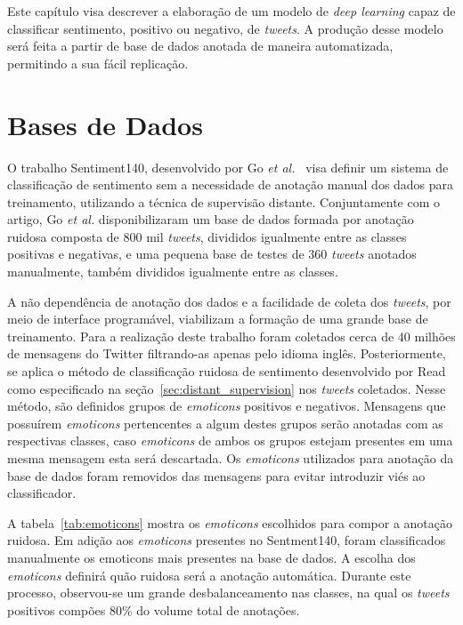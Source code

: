 Este capítulo visa descrever a elaboração de um modelo de \textit{deep learning} capaz de classificar sentimento,
positivo ou negativo, de \textit{tweets}.
A produção desse modelo será feita a partir de base de dados anotada de maneira automatizada, permitindo a sua
fácil replicação.

\section{Bases de Dados} \label{sec:data}

O trabalho Sentiment140, desenvolvido por Go \textit{et al.}~\cite{go09} visa definir um sistema de classificação de
sentimento sem a necessidade de anotação manual dos dados para treinamento, utilizando a técnica de supervisão distante.
Conjuntamente com o artigo, Go \textit{et al.} disponibilizaram um base de dados formada por anotação ruidosa composta
de 800 mil \textit{tweets}, divididos igualmente entre as classes positivas e negativas, e uma pequena base de testes de
360 \textit{tweets} anotados manualmente, também divididos igualmente entre as classes.

A não dependência de anotação dos dados e a facilidade de coleta dos \textit{tweets}, por meio de interface programável,
viabilizam a formação de uma grande base de treinamento.
Para a realização deste trabalho foram coletados cerca de 40 milhões de mensagens do Twitter filtrando-as apenas pelo
idioma inglês.
Posteriormente, se aplica o método de classificação ruidosa de sentimento desenvolvido por Read~\cite{read05} como
especificado na seção~\ref{sec:distant_supervision} nos \textit{tweets} coletados.
Nesse método, são definidos grupos de \textit{emoticons} positivos e negativos.
Mensagens que possuírem \textit{emoticons} pertencentes a algum destes grupos serão anotadas com as respectivas classes,
caso \textit{emoticons} de ambos os grupos estejam presentes em uma mesma mensagem esta será descartada.
Os \textit{emoticons} utilizados para anotação da base de dados foram removidos das mensagens para evitar introduzir
viés ao classificador.

A tabela~\ref{tab:emoticons} mostra os \textit{emoticons} escolhidos para compor a anotação ruidosa.
Em adição aos \textit{emoticons} presentes no Sentment140, foram classificados manualmente os emoticons mais presentes
na base de dados.
A escolha dos \textit{emoticons} definirá quão ruidosa será a anotação automática.
Durante este processo, observou-se um grande desbalanceamento nas classes, na qual os \textit{tweets} positivos
compões 80\% do volume total de anotações.

